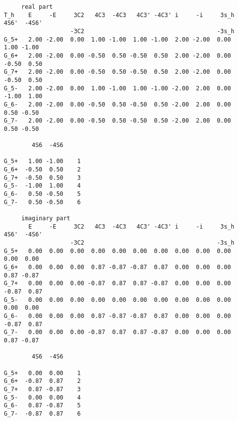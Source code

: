 \documentclass[12pt,a4paper,twoside]{report}
\begin{document}
\begin{tcolorbox}
\begin{scriptsize}
\begin{verbatim}
     real part
T_h    E     -E     3C2   4C3  -4C3   4C3' -4C3' i     -i     3s_h 4S6'  -4S6'
                   -3C2                                      -3s_h            
G_5+   2.00 -2.00  0.00  1.00 -1.00  1.00 -1.00  2.00 -2.00  0.00  1.00 -1.00
G_6+   2.00 -2.00  0.00 -0.50  0.50 -0.50  0.50  2.00 -2.00  0.00 -0.50  0.50
G_7+   2.00 -2.00  0.00 -0.50  0.50 -0.50  0.50  2.00 -2.00  0.00 -0.50  0.50
G_5-   2.00 -2.00  0.00  1.00 -1.00  1.00 -1.00 -2.00  2.00  0.00 -1.00  1.00
G_6-   2.00 -2.00  0.00 -0.50  0.50 -0.50  0.50 -2.00  2.00  0.00  0.50 -0.50
G_7-   2.00 -2.00  0.00 -0.50  0.50 -0.50  0.50 -2.00  2.00  0.00  0.50 -0.50

        4S6  -4S6 
                  
G_5+   1.00 -1.00    1
G_6+  -0.50  0.50    2
G_7+  -0.50  0.50    3
G_5-  -1.00  1.00    4
G_6-   0.50 -0.50    5
G_7-   0.50 -0.50    6

     imaginary part
       E     -E     3C2   4C3  -4C3   4C3' -4C3' i     -i     3s_h 4S6'  -4S6'
                   -3C2                                      -3s_h            
G_5+   0.00  0.00  0.00  0.00  0.00  0.00  0.00  0.00  0.00  0.00  0.00  0.00
G_6+   0.00  0.00  0.00  0.87 -0.87 -0.87  0.87  0.00  0.00  0.00  0.87 -0.87
G_7+   0.00  0.00  0.00 -0.87  0.87  0.87 -0.87  0.00  0.00  0.00 -0.87  0.87
G_5-   0.00  0.00  0.00  0.00  0.00  0.00  0.00  0.00  0.00  0.00  0.00  0.00
G_6-   0.00  0.00  0.00  0.87 -0.87 -0.87  0.87  0.00  0.00  0.00 -0.87  0.87
G_7-   0.00  0.00  0.00 -0.87  0.87  0.87 -0.87  0.00  0.00  0.00  0.87 -0.87

        4S6  -4S6 
                  
G_5+   0.00  0.00    1
G_6+  -0.87  0.87    2
G_7+   0.87 -0.87    3
G_5-   0.00  0.00    4
G_6-   0.87 -0.87    5
G_7-  -0.87  0.87    6
\end{verbatim}  
\end{scriptsize}
\end{tcolorbox}
\end{document}
